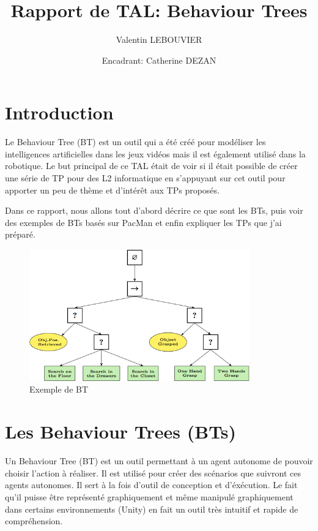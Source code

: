 \documentclass[11pt]{article}
\author{Valentin LEBOUVIER}
\date{Encadrant: Catherine DEZAN}
\title{Rapport de TAL: Behaviour Trees}
\begin{document}
\maketitle
\tableofcontents



\section{Introduction}
\label{sec-1}
Le Behaviour Tree (BT) est un outil qui a été créé pour modéliser les intelligences artificielles dans les jeux vidéos mais il est également utilisé dans la robotique. Le but principal de ce TAL était de voir si il était possible de créer une série de TP pour des L2 informatique en s'appuyant sur cet outil pour apporter un peu de thème et d'intérêt aux TPs proposés.

Dans ce rapport, nous allons tout d'abord décrire ce que sont les BTs, puis voir des exemples de BTs basés sur PacMan et enfin expliquer les TPs que j'ai préparé.

\begin{figure}[htb]
\centering
\includegraphics[width=0.85\textwidth]{./img/BT_search_and_grasp.png}
\caption{Exemple de BT}
\end{figure}

\section{Les Behaviour Trees (BTs)}
\label{sec-2}


Un Behaviour Tree (BT) est un outil permettant à un agent autonome de pouvoir choisir l'action à réaliser.
Il est utilisé pour créer des scénarios que suivront ces agents autonomes.
Il sert à la fois d'outil de conception et d'éxécution.
Le fait qu'il puisse être représenté graphiquement et même manipulé graphiquement dans certains environnements (Unity) en fait un outil très intuitif et rapide de compréhension.
\end{document}
